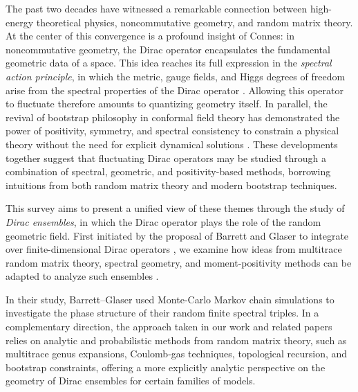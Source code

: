 \documentclass[11pt]{article}
\theoremstyle{plain}
\begin{document}
The past two decades have witnessed a  remarkable  connection  between high-energy theoretical physics, noncommutative  geometry, and random matrix theory. At the center of this convergence is a profound insight of Connes: in noncommutative geometry, the Dirac operator encapsulates the fundamental geometric data of a space. This idea reaches its full expression in the {\it spectral action principle}, in which the metric, gauge fields, and Higgs degrees of freedom arise from the spectral properties of the Dirac operator \cite{Connes94, Connes95, NCG and Reality, Connes Inner Fluctuations, ConnesRecon, Spectral action, Neutrino Mixing}. Allowing this operator to fluctuate therefore amounts to quantizing geometry itself. In parallel, the revival of bootstrap philosophy in conformal field theory has demonstrated the power of positivity, symmetry, and spectral consistency to constrain a physical theory without the need for explicit dynamical solutions \cite{RRTV, bootstraps}. These developments together suggest that fluctuating Dirac operators may be studied through a combination of spectral, geometric, and positivity-based methods, borrowing intuitions from both random matrix theory and modern bootstrap techniques.

This survey aims to present a unified view of these themes through the study of \emph{Dirac ensembles}, in which the Dirac operator plays the role of the random geometric field. First initiated by the proposal of Barrett and Glaser to integrate over finite-dimensional Dirac operators \cite{Barrett2015, Barrett2016, glaser}, we examine how ideas from multitrace random matrix theory, spectral geometry,  and moment-positivity methods  can be adapted to analyze such ensembles \cite{Azafar2024,  hessam2022bootstrapping,  hessam2022fromnoncom, hessam2023double,  bootstraps, bootstraps berenstein, bootstraps Kazakov, bootstraps critical behaviour}.


 In their study, Barrett–Glaser  used  Monte-Carlo Markov chain simulations to investigate the phase structure of their random finite spectral triples. In a complementary direction, the approach taken in our work and related papers relies on analytic and probabilistic methods from random matrix theory, such as multitrace genus expansions, Coulomb-gas techniques, topological recursion, and bootstrap constraints, offering a more explicitly analytic perspective on the geometry of Dirac ensembles for certain families of models.
\end{document}
